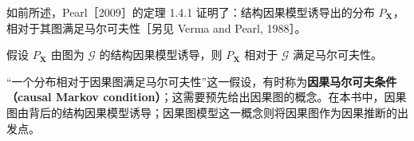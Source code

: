 如前所述，Pearl［2009］的定理 1.4.1 证明了：结构因果模型诱导出的分布 $P_{\mathbf X}$，相对于其图满足马尔可夫性［另见 Verma and Pearl, 1988］。

\begin{proposition}[结构因果模型蕴含马尔可夫性]
假设 $P_{\mathbf X}$ 由图为 $\mathcal G$ 的结构因果模型诱导，则 $P_{\mathbf X}$ 相对于 $\mathcal G$ 满足马尔可夫性。
\end{proposition}

“一个分布相对于因果图满足马尔可夫性”这一假设，有时称为\textbf{因果马尔可夫条件（causal Markov condition）}；这需要预先给出因果图的概念。在本书中，因果图由背后的结构因果模型诱导；因果图模型这一概念则将因果图作为因果推断的出发点。
\FloatBarrier
